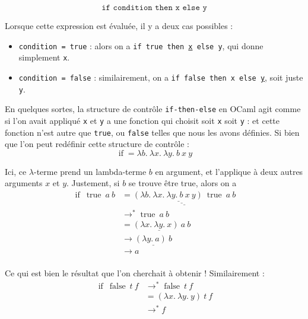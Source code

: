 \documentclass[11pt]{article}
\begin{document}
\begin{equation*}
    \texttt{if condition then x else y}
\end{equation*}

\newpage
Lorsque cette expression est évaluée, il y a deux cas possibles :
\begin{itemize}
    \item \verb|condition = true| : alors on a \texttt{if true then }\underline{\texttt{x}}\texttt{ else y}, qui donne simplement \verb|x|.
    \item \verb|condition = false| : similairement, on a \texttt{if false then x else }\underline{\texttt{y}}, soit juste \verb|y|.
\end{itemize}

En quelques sortes, la structure de contrôle \verb|if-then-else| en OCaml agit comme si l'on avait appliqué \verb|x| et \verb|y| a une fonction qui choisit soit \verb|x| soit \verb|y| : et cette fonction n'est autre que \verb|true|, ou \verb|false| telles que nous les avons définies. Si bien que l'on peut redéfinir cette structure de contrôle :
$$\operatorname{if} = \lambda b.~\lambda x.~\lambda y.~b~x~y$$

Ici, ce $\lambda$-terme prend un lambda-terme $b$ en argument, et l'applique à deux autres arguments $x$ et $y$. Justement, si $b$ se trouve être true, alors on a
\begin{equation*}
\begin{aligned}
    \operatorname{if}~\operatorname{true}~a~b&=\underline{\underline{\underline{(\lambda b.~\lambda x.~\lambda y.~b~x~y)~\operatorname{true}}~a}~b}\\
    &\longrightarrow^*\operatorname{true}~a~b\\
    &=\underline{(\lambda x.~\lambda y.~x)~a}~b\\
    &\longrightarrow \underline{(\lambda y.~a)~b}\\
    &\longrightarrow a\\
\end{aligned}
\end{equation*}

Ce qui est bien le résultat que l'on cherchait à obtenir !
Similairement :
\begin{equation*}
\begin{aligned}
    \operatorname{if}~\operatorname{false}~t~f&\longrightarrow^*\operatorname{false}~t~f\\
    &=(\lambda x.~\lambda y.~y)~t~f\\
    &\longrightarrow^* f
\end{aligned}
\end{equation*}
\end{document}
